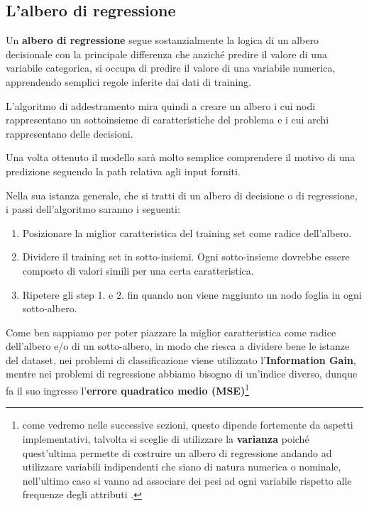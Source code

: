 \documentclass[a4paper, 11pt, oneside]{report}
\begin{document}
                \subsection{L'albero di regressione}
                Un \textbf{albero di regressione} segue sostanzialmente la logica di un albero decisionale con la principale
                differenza che anziché predire il valore di una variabile categorica, si occupa di predire il valore di
                una variabile numerica, apprendendo semplici regole inferite dai dati di training.
                \par \noindent L'algoritmo di addestramento mira quindi a creare un albero i cui nodi rappresentano un sottoinsieme
                di caratteristiche del problema e i cui archi rappresentano delle decisioni.
                \par \noindent Una volta ottenuto il modello sarà molto semplice comprendere il motivo di una predizione
                seguendo la path relativa agli input forniti.\\
                \par \noindent Nella sua istanza generale, che si tratti di un albero di decisione o di regressione, i
                passi dell'algoritmo saranno i seguenti:
                \begin{enumerate}
                    \item Posizionare la miglior caratteristica del training set come radice dell'albero.
                    \item Dividere il training set in sotto-insiemi. Ogni sotto-insieme dovrebbe essere composto di valori
                    simili per una certa caratteristica.
                    \item Ripetere gli step 1. e 2. fin quando non viene raggiunto un nodo foglia in ogni sotto-albero.
                \end{enumerate}
                \medskip
                \par \noindent Come ben sappiamo per poter piazzare la miglior caratteristica come radice dell'albero e/o
                di un sotto-albero, in modo che riesca a dividere bene le istanze del dataset, nei problemi di classificazione
                viene utilizzato l'\textbf{Information Gain}, mentre nei problemi di regressione abbiamo bisogno di un'indice
                diverso, dunque fa il suo ingresso l'\textbf{errore quadratico medio (MSE)}\footnote{come vedremo nelle
                successive sezioni, questo dipende fortemente da aspetti implementativi, talvolta si sceglie di utilizzare
                la \textbf{varianza} poiché quest'ultima permette di costruire un albero di regressione andando ad utilizzare
                variabili indipendenti che siano di natura numerica o nominale, nell'ultimo caso si vanno ad associare dei
                pesi ad ogni variabile rispetto alle frequenze degli attributi \cite{8}.}
\end{document}
